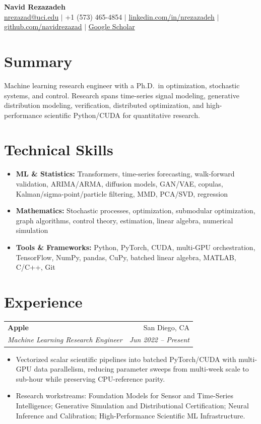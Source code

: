\documentclass[10pt,letterpaper]{article}
\makeatletter
\newcommand{\resumeSubheading}[4]{
  \vspace{-1pt}
  \begin{tabular*}{\textwidth}[t]{l@{\extracolsep{\fill}}r}
    \textbf{#1} & #2 \\
    \textit{\small #3} & \textit{\small #4} \\
  \end{tabular*}\vspace{-5pt}
}
\newcommand{\resumeItem}[1]{\item\small{#1}\vspace{-2pt}}
\makeatother
\begin{document}
\begin{center}
  {\LARGE\textbf{Navid Rezazadeh}}\\[4pt]
  \small
  \href{mailto:nrezazad@uci.edu}{nrezazad@uci.edu} $\vert$
  +1 (573) 465-4854 $\vert$
  \href{https://linkedin.com/in/nrezazadeh}{linkedin.com/in/nrezazadeh} $\vert$
  \href{https://github.com/navidrezazad}{github.com/navidrezazad} $\vert$
  \href{https://tinyurl.com/NavidScholar}{Google Scholar}
\end{center}

\section{Summary}
\small
Machine learning research engineer with a Ph.D.\ in optimization, stochastic systems, and control. Research spans time-series signal modeling, generative distribution modeling, verification, distributed optimization, and high-performance scientific Python/CUDA for quantitative research.

\section{Technical Skills}
\begin{itemize}[leftmargin=0.15in, label={}, itemsep=-2pt, parsep=2pt]
  \item \textbf{ML \& Statistics:} Transformers, time-series forecasting, walk-forward validation, ARIMA/ARMA, diffusion models, GAN/VAE, copulas, Kalman/sigma-point/particle filtering, MMD, PCA/SVD, regression
  \item \textbf{Mathematics:} Stochastic processes, optimization, submodular optimization, graph algorithms, control theory, estimation, linear algebra, numerical simulation
  \item \textbf{Tools \& Frameworks:} Python, PyTorch, CUDA, multi-GPU orchestration, TensorFlow, NumPy, pandas, CuPy, batched linear algebra, MATLAB, C/C++, Git
\end{itemize}

\section{Experience}
\resumeSubheading{Apple}{San Diego, CA}{Machine Learning Research Engineer}{Jun 2022 -- Present}
\begin{itemize}[leftmargin=0.15in, itemsep=-2pt, parsep=2pt]
  \resumeItem{Vectorized scalar scientific pipelines into batched PyTorch/CUDA with multi-GPU data parallelism, reducing parameter sweeps from multi-week scale to sub-hour while preserving CPU-reference parity.}
  \resumeItem{Research workstreams: Foundation Models for Sensor and Time-Series Intelligence; Generative Simulation and Distributional Certification; Neural Inference and Calibration; High-Performance Scientific ML Infrastructure.}
\end{itemize}
\end{document}
